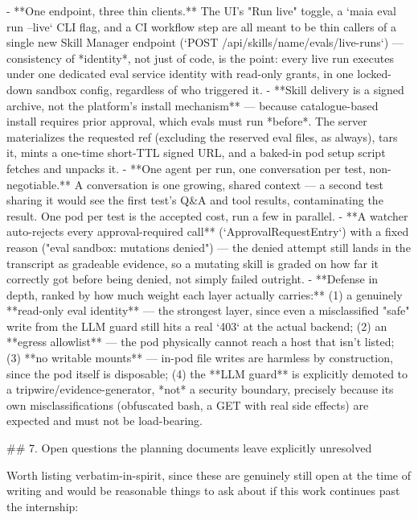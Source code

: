 - **One endpoint, three thin clients.** The UI's "Run live" toggle, a `maia eval run --live` CLI flag, and a CI workflow step are all meant to be thin callers of a single new Skill Manager endpoint (`POST /api/skills/{name}/evals/live-runs`) — consistency of *identity*, not just of code, is the point: every live run executes under one dedicated eval service identity with read-only grants, in one locked-down sandbox config, regardless of who triggered it.
- **Skill delivery is a signed archive, not the platform's install mechanism** — because catalogue-based install requires prior approval, which evals must run *before*. The server materializes the requested ref (excluding the reserved eval files, as always), tars it, mints a one-time short-TTL signed URL, and a baked-in pod setup script fetches and unpacks it.
- **One agent per run, one conversation per test, non-negotiable.** A conversation is one growing, shared context — a second test sharing it would see the first test's Q&A and tool results, contaminating the result. One pod per test is the accepted cost, run a few in parallel.
- **A watcher auto-rejects every approval-required call** (`ApprovalRequestEntry`) with a fixed reason ("eval sandbox: mutations denied") — the denied attempt still lands in the transcript as gradeable evidence, so a mutating skill is graded on how far it correctly got before being denied, not simply failed outright.
- **Defense in depth, ranked by how much weight each layer actually carries:** (1) a genuinely **read-only eval identity** — the strongest layer, since even a misclassified "safe" write from the LLM guard still hits a real `403` at the actual backend; (2) an **egress allowlist** — the pod physically cannot reach a host that isn't listed; (3) **no writable mounts** — in-pod file writes are harmless by construction, since the pod itself is disposable; (4) the **LLM guard** is explicitly demoted to a tripwire/evidence-generator, *not* a security boundary, precisely because its own misclassifications (obfuscated bash, a GET with real side effects) are expected and must not be load-bearing.

## 7. Open questions the planning documents leave explicitly unresolved

Worth listing verbatim-in-spirit, since these are genuinely still open at the time of writing and would be reasonable things to ask about if this work continues past the internship:

